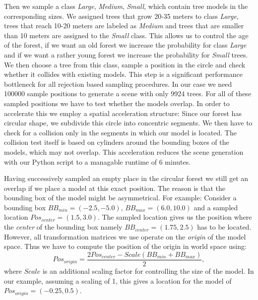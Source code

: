 Then we sample a class \textit{Large}, \textit{Medium}, \textit{Small}, which contain tree models in the corresponding sizes.
We assigned trees that grow 20-35 meters to class \textit{Large}, trees that reach 10-20 meters are labeled as \textit{Medium} and trees that are smaller than 10 meters are assigned to the \textit{Small} class.
This allows us to control the age of the forest, if we want an old forest we increase the probability for class \textit{Large} and if we want a rather young forest we increase the probability for \textit{Small} trees.
We then choose a tree from this class, sample a position in the circle and check whether it collides with existing models.
This step is a significant performance bottleneck for all rejection based sampling procedures.
In our case we need 100000 sample positions to generate a scene with only 9924 trees.
For all of these sampled positions we have to test whether the models overlap.
In order to accelerate this we employ a spatial acceleration structure: Since our forest has circular shape, we subdivide this circle into concentric segments.
We then have to check for a collision only in the segments in which our model is located.
The collision test itself is based on cylinders around the bounding boxes of the models, which may not overlap.
This acceleration reduces the scene generation with our Python script to a managable runtime of 6 minutes.

Having successively sampled an empty place in the circular forest we still get an overlap if we place a model at this exact position.
The reason is that the bounding box of the model might be asymmetrical.
For example: Consider a bounding box $BB_{min}=(-2.5, -5.0)$, $BB_{max}=(6.0, 10.0)$ and a sampled location $Pos_{center}=(1.5, 3.0)$.
The sampled location gives us the position where the \textit{center} of the bounding box namely $BB_{center}=(1.75, 2.5)$ has to be located.
However, all transformation matrices we use operate on the \textit{origin} of the model space.
Thus we have to compute the position of the origin in world space using:
\begin{equation*}
    Pos_{origin}=\frac{2Pos_{center}-Scale(BB_{min}+BB_{max})}{2},
\end{equation*}
where $Scale$ is an additional scaling factor for controlling the size of the model.
In our example, assuming a scaling of 1, this gives a location for the model of $Pos_{origin}=(-0.25, 0.5)$.

